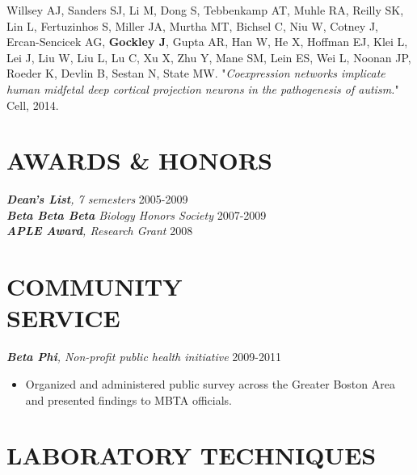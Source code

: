 \documentclass[margin, 10pt]{res} %
\begin{document}
\begin{resume}
Willsey AJ, Sanders SJ, Li M, Dong S, Tebbenkamp AT, Muhle RA, Reilly SK, Lin L, Fertuzinhos S, Miller JA, Murtha MT, Bichsel C, Niu W, Cotney J, Ercan-Sencicek AG, \textbf{Gockley J}, Gupta AR, Han W, He X, Hoffman EJ, Klei L, Lei J, Liu W, Liu L, Lu C, Xu X, Zhu Y, Mane SM, Lein ES, Wei L, Noonan JP, Roeder K, Devlin B, Sestan N, State MW. "{\sl Coexpression networks implicate human midfetal deep cortical projection neurons in the pathogenesis of autism.}" Cell, 2014.


\section{AWARDS \& HONORS} 

{\sl \textbf{Dean's List}, 7 semesters} \hfill 2005-2009 \\
{\sl \textbf{Beta Beta Beta} Biology Honors Society} \hfill 2007-2009 \\
{\sl \textbf{APLE Award}, Research Grant} \hfill 2008



\section{COMMUNITY \\ SERVICE}

{\sl \textbf{Beta Phi}, Non-profit public health initiative} \hfill 2009-2011
\begin{itemize}
\item Organized and administered public survey across the Greater Boston Area and presented findings to MBTA officials. 
\end{itemize} 


\section{LABORATORY TECHNIQUES}


\end{resume}
\end{document}
